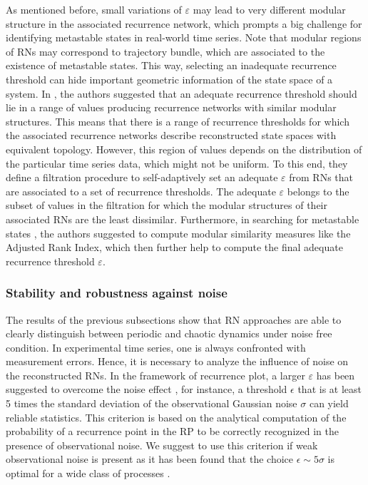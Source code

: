 		 As mentioned before, small variations of $\varepsilon$ may lead to very different modular structure in the associated recurrence network, which prompts a big challenge for identifying metastable states in real-world time series. Note that modular regions of RNs may correspond to trajectory bundle, which are associated to the existence of metastable states. This way, selecting an inadequate recurrence threshold can hide important geometric information of the state space of a system. In \cite{Vega2016}, the authors suggested that an adequate recurrence threshold should lie in a range of values producing recurrence networks with similar modular structures. This means that there is a range of recurrence thresholds for which the associated recurrence networks describe reconstructed state spaces with equivalent topology. However, this region of values depends on the distribution of the particular time series data, which might not be uniform. To this end, they define a filtration procedure to self-adaptively set an adequate $\varepsilon$ from RNs that are associated to a set of recurrence thresholds. The adequate $\varepsilon$ belongs to the subset of values in the filtration for which the modular structures of their associated RNs are the least dissimilar. Furthermore, in searching for metastable states \cite{Vega2016}, the authors suggested to compute modular similarity measures like the Adjusted Rank Index, which then further help to compute the final adequate recurrence threshold $\varepsilon$. 	
		 
		\subsubsection{Stability and robustness against noise}
        		The results of the previous subsections show that RN approaches are able to clearly distinguish between periodic and chaotic dynamics under noise free condition. In experimental time series, one is always confronted with measurement errors. Hence, it is necessary to analyze the influence of noise on the reconstructed RNs. In the framework of recurrence plot, a larger $\varepsilon$ has been suggested to overcome the noise effect \cite{thiel2002}, for instance, a threshold $\epsilon$ that is at least 5 times the standard deviation of the observational Gaussian noise $\sigma$ can yield reliable statistics. This criterion is based on the analytical computation of the probability of a recurrence point in the RP to be correctly recognized in the presence of observational noise. We suggest to use this criterion if weak observational noise is present as it has been found that the choice $\epsilon \sim 5\sigma$ is optimal for a wide class of processes \cite{thiel2002}. 		
	
